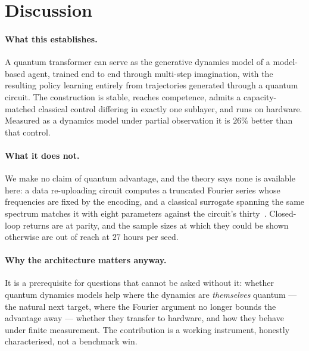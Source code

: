 \documentclass[11pt]{article}
\begin{document}
\section{Discussion}
\paragraph{What this establishes.} A quantum transformer can serve as
the generative dynamics model of a model-based agent, trained end to end
through multi-step imagination, with the resulting policy learning
entirely from trajectories generated through a quantum circuit. The
construction is stable, reaches competence, admits a capacity-matched
classical control differing in exactly one sublayer, and runs on
hardware. Measured as a dynamics model under partial observation it is
$26\%$ better than that control.

\paragraph{What it does not.} We make no claim of quantum advantage, and
the theory says none is available here: a data re-uploading circuit
computes a truncated Fourier series whose frequencies are fixed by the
encoding, and a classical surrogate spanning the same spectrum matches
it with eight parameters against the circuit's
thirty~\cite{schuld2021,papera}. Closed-loop returns are at parity, and
the sample sizes at which they could be shown otherwise are out of
reach at $27$ hours per seed.

\paragraph{Why the architecture matters anyway.} It is a prerequisite
for questions that cannot be asked without it: whether quantum dynamics
models help where the dynamics are \emph{themselves} quantum --- the
natural next target, where the Fourier argument no longer bounds the
advantage away --- whether they transfer to hardware, and how they
behave under finite measurement. The contribution is a working
instrument, honestly characterised, not a benchmark win.

\end{document}
